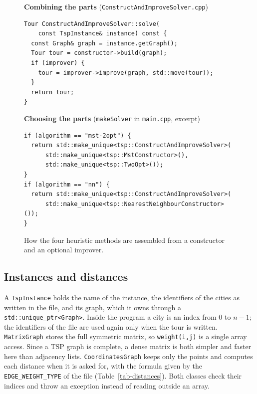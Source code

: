 \documentclass[10pt,a4paper]{article}
\begin{document}
\begin{figure}[H]
\noindent
\begin{minipage}[t]{0.47\linewidth}
\vspace{0pt}
{\footnotesize\raggedright\textbf{Combining the parts} (\texttt{ConstructAndImproveSolver.cpp})\par}
\begin{lstlisting}[style=side]
Tour ConstructAndImproveSolver::solve(
    const TspInstance& instance) const {
  const Graph& graph = instance.getGraph();
  Tour tour = constructor->build(graph);
  if (improver) {
    tour = improver->improve(graph, std::move(tour));
  }
  return tour;
}
\end{lstlisting}
\end{minipage}\hfill
\begin{minipage}[t]{0.51\linewidth}
\vspace{0pt}
{\footnotesize\raggedright\textbf{Choosing the parts} (\texttt{makeSolver} in \texttt{main.cpp}, excerpt)\par}
\begin{lstlisting}[style=side]
if (algorithm == "mst-2opt") {
  return std::make_unique<tsp::ConstructAndImproveSolver>(
      std::make_unique<tsp::MstConstructor>(),
      std::make_unique<tsp::TwoOpt>());
}
if (algorithm == "nn") {
  return std::make_unique<tsp::ConstructAndImproveSolver>(
      std::make_unique<tsp::NearestNeighbourConstructor>());
}
\end{lstlisting}
\end{minipage}
\caption{How the four heuristic methods are assembled from a constructor and an optional improver.}
\label{fig-compose}
\end{figure}

\subsection{Instances and distances}\label{sec-distances}

A \texttt{TspInstance} holds the name of the instance, the identifiers of the cities as written in the file, and its graph, which it owns through a \texttt{std::unique\_ptr<Graph>}. Inside the program a city is an index from 0 to $n-1$; the identifiers of the file are used again only when the tour is written. \texttt{MatrixGraph} stores the full symmetric matrix, so \texttt{weight(i,j)} is a single array access. Since a TSP graph is complete, a dense matrix is both simpler and faster here than adjacency lists. \texttt{CoordinatesGraph} keeps only the points and computes each distance when it is asked for, with the formula given by the \texttt{EDGE\_WEIGHT\_TYPE} of the file (Table~\ref{tab-distances}). Both classes check their indices and throw an exception instead of reading outside an array.
\end{document}
